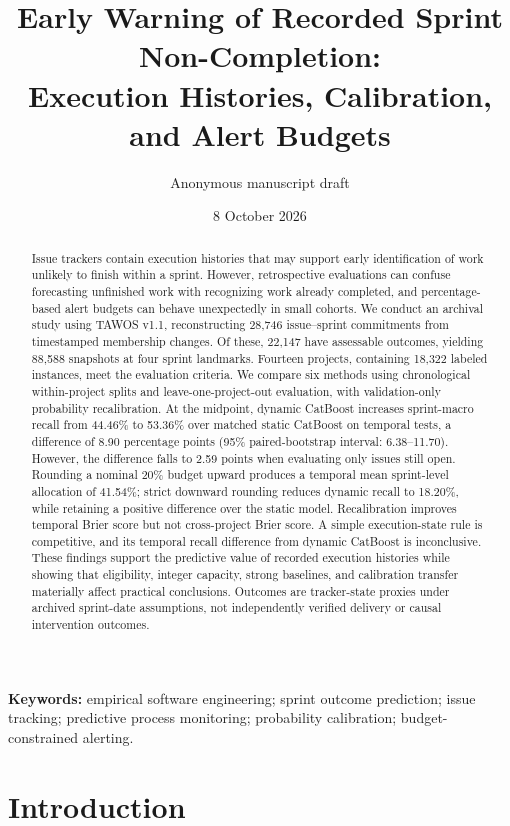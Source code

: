 \documentclass[11pt,a4paper]{article}
\title{Early Warning of Recorded Sprint Non-Completion:\\Execution Histories, Calibration, and Alert Budgets}
\author{Anonymous manuscript draft}
\date{8 October 2026}
\begin{document}
\maketitle
\begin{abstract}
Issue trackers contain execution histories that may support early identification of work unlikely to finish within a sprint. However, retrospective evaluations can confuse forecasting unfinished work with recognizing work already completed, and percentage-based alert budgets can behave unexpectedly in small cohorts. We conduct an archival study using TAWOS v1.1, reconstructing 28,746 issue--sprint commitments from timestamped membership changes. Of these, 22,147 have assessable outcomes, yielding 88,588 snapshots at four sprint landmarks. Fourteen projects, containing 18,322 labeled instances, meet the evaluation criteria. We compare six methods using chronological within-project splits and leave-one-project-out evaluation, with validation-only probability recalibration. At the midpoint, dynamic CatBoost increases sprint-macro recall from 44.46\% to 53.36\% over matched static CatBoost on temporal tests, a difference of 8.90 percentage points (95\% paired-bootstrap interval: 6.38--11.70). However, the difference falls to 2.59 points when evaluating only issues still open. Rounding a nominal 20\% budget upward produces a temporal mean sprint-level allocation of 41.54\%; strict downward rounding reduces dynamic recall to 18.20\%, while retaining a positive difference over the static model. Recalibration improves temporal Brier score but not cross-project Brier score. A simple execution-state rule is competitive, and its temporal recall difference from dynamic CatBoost is inconclusive. These findings support the predictive value of recorded execution histories while showing that eligibility, integer capacity, strong baselines, and calibration transfer materially affect practical conclusions. Outcomes are tracker-state proxies under archived sprint-date assumptions, not independently verified delivery or causal intervention outcomes.

\end{abstract}
\noindent\textbf{Keywords:} empirical software engineering; sprint outcome prediction; issue tracking; predictive process monitoring; probability calibration; budget-constrained alerting.

\section{Introduction}\label{introduction}
\end{document}
